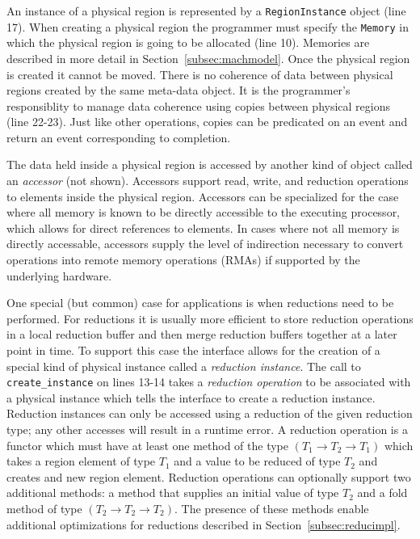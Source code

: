 An instance of a physical region is represented by a {\tt RegionInstance} object (line 17).
When creating a physical region the programmer must specify the {\tt Memory}
in which the physical region is going to be allocated (line 10).  Memories are described
in more detail in Section~\ref{subsec:machmodel}.  Once the physical region is created it
cannot be moved.   There is no coherence of data between physical regions created by the 
same meta-data object.  It is the programmer's responsiblity to manage data coherence
using copies between physical regions (line 22-23).  Just like other operations,
copies can be predicated on an event and return an event corresponding to
completion.  

The data held inside a physical region is accessed by another kind of object called an
{\em accessor} (not shown).  Accessors support read, write, and reduction operations
to elements inside the physical region.  Accessors can be specialized for the case where
all memory is known to be directly accessible to the executing processor, which allows 
for direct references to elements.  In cases where not all memory is directly accessable, 
accessors supply the level of indirection necessary to convert operations into remote 
memory operations (RMAs) if supported by the underlying hardware.  

One special (but common) case for applications is when reductions need to be performed.
For reductions it is usually more efficient to store reduction
operations in a local reduction buffer and then merge reduction buffers together at a later
point in time.  To support this case the interface allows for the creation of a special kind
of physical instance called a {\em reduction instance}.  The call to {\tt create\_instance} on
lines 13-14 takes a {\em reduction operation} to be associated with a physical instance which
tells the interface to create a reduction instance.  Reduction instances can only be accessed
using a reduction of the given reduction type; any other accesses will result in a runtime
error.  A reduction operation is a functor which must have at least one method of the type
$(T_1 \rightarrow T_2 \rightarrow T_1)$ which takes a region element of type $T_1$ and a value
to be reduced of type $T_2$ and creates and new region element.  Reduction operations can optionally 
support two additional methods: a method that supplies an initial value of type $T_2$ and a 
fold method of type $(T_2 \rightarrow T_2 \rightarrow T_2)$.  The presence of these methods
enable additional optimizations for reductions described in Section~\ref{subsec:reducimpl}.

